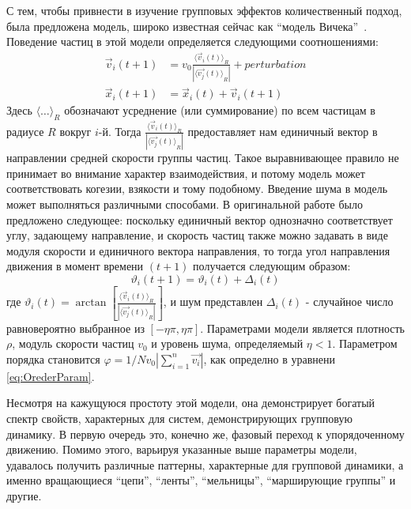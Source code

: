    С тем, чтобы привнести в изучение групповых эффектов количественный подход, была предложена модель, широко известная сейчас как ``модель Вичека''~\cite{vicsek1995}. Поведение частиц в этой модели определяется следующими соотношениями:
    \begin{align}
    \label{eq:ViksecEquationsOfMotion}
        \vec{v}_i(t+1) &= v_0 \frac{{\langle \vec{v}_i(t) \rangle}_R}{|{\langle \vec{v_j}(t) \rangle}_R|} + perturbation \\
        \vec{x}_i(t+1) &= \vec{x}_i(t)+\vec{v}_i(t+1)
    \end{align}
    Здесь ${\langle \dots \rangle}_R$ обозначают усреднение (или суммирование) по всем частицам в радиусе $R$ вокруг $i$-й. Тогда $ \frac{{\langle \vec{v}_i(t) \rangle}_R}{|{\langle \vec{v_j}(t) \rangle}_R|}$ предоставляет нам единичный вектор в направлении средней скорости группы частиц. Такое выравнивающее правило не принимает во внимание характер взаимодействия, и потому модель может соответствовать когезии, взякости и тому подобному. Введение шума в модель может выполняться различными способами. В оригинальной работе было предложено следующее: поскольку единичный вектор однозначно соответствует углу, задающему направление, и скорость частиц также можно задавать в виде модуля скорости и единичного вектора направления, то тогда угол направления движения в момент времени $(t+1)$ получается следующим образом:
    \begin{equation}
        \vartheta_i (t+1) = \vartheta_i(t) + \Delta_i(t)
    \end{equation}
    где $\vartheta_i(t) = \arctan [{\frac{{\langle \vec{v}_i(t) \rangle}_R}{|{\langle \vec{v_j}(t) \rangle}_R|}}]$, и шум представлен $\Delta_i(t)$ - случайное число равновероятно выбранное из $[-\eta \pi,\eta \pi]$. Параметрами модели является плотность $\rho$, модуль скорости частиц $v_0$ и уровень шума, определяемый $\eta < 1$. Параметром порядка становится 
    $\varphi = 1/{N v_0} |{\sum\limits_{i=1}^n \vec{v_i}}|$, как определно в уравнени \ref{eq:OrederParam}.

    Несмотря на кажущуюся простоту этой модели, она демонстрирует богатый спектр свойств, характерных для систем, демонстрирующих групповую динамику. В первую очередь это, конечно же, фазовый переход к упорядоченному движению. Помимо этого, варьируя указанные выше параметры модели, удавалось получить различные паттерны, характерные для групповой динамики, а именно вращающиеся ``цепи'', ``ленты'', ``мельницы'', ``марширующие группы'' и другие.

